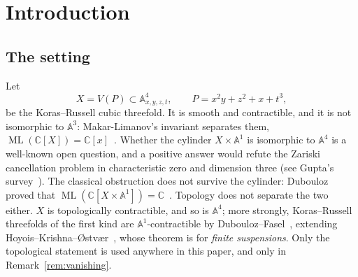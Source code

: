 \documentclass[11pt]{article}
\theoremstyle{definition}
\theoremstyle{remark}
\newcommand{\C}{\mathbb{C}}
\newcommand{\Aff}[1]{\mathbb{A}^{#1}}
\newcommand{\Gm}{\mathbb{G}_m}
\newcommand{\HBM}[1]{H^{\mathrm{BM}}_{#1}}
\newcommand{\ML}{\operatorname{ML}}
\begin{document}
\begin{abstract}
modification divisor, having the representative $F_{-1}$ contained in it, and
restricts to zero on the common open set. Its inverse image
$\sigma_4^{-1}(F_{-1})$ is $\Gm\times\Aff{1}$ --- the same plane with the fibre
over the defect point $(-1,0,0,0,0)$ deleted --- and the fundamental class of
that locus, pushed forward along its \emph{closed immersion} into the source,
lands in $\HBM{4}(X\times\Aff{1})=0$. We do not push classes forward along the
modification itself: it is not proper, as we prove. The defect thus accounts
exactly for the Euler and Grothendieck-class change and locates, at a single
named point, the cycle-level content of the change. This is a concrete
singular-defect instance of the established cofiber mechanism for affine
modifications. Nothing here bears on whether $X\times\Aff{1}\cong\Aff{4}$, and
no claim about that question is made.
\end{abstract}

\tableofcontents

\section{Introduction}\label{sec:intro}

\subsection{The setting}

Let
\begin{equation}\label{eq:X}
X = V(P)\subset\Aff{4}_{x,y,z,t},\qquad P = x^2y+z^2+x+t^3,
\end{equation}
be the Koras--Russell cubic threefold. It is smooth and contractible, and it
is not isomorphic to $\Aff{3}$: Makar-Limanov's invariant separates them,
$\ML(\C[X])=\C[x]$~\cite{MakarLimanov1996}. Whether the cylinder
$X\times\Aff{1}$ is isomorphic to $\Aff{4}$ is a well-known open question,
and a positive answer would refute the Zariski cancellation problem in
characteristic zero and dimension three (see Gupta's survey~\cite{Gupta2022}).
The classical obstruction does not survive the cylinder: Dubouloz proved that
$\ML(\C[X\times\Aff{1}])=\C$~\cite{Dubouloz2009}. Topology does not separate
the two either. $X$ is topologically contractible, and so is $\Aff{4}$; more
strongly, Koras--Russell threefolds of the first kind are
$\Aff{1}$-contractible by Dubouloz--Fasel~\cite{DF2015}, extending
Hoyois--Krishna--{\O}stv{\ae}r~\cite{HKO2014}, whose theorem is for
\emph{finite suspensions}. Only the topological statement is used anywhere in
this paper, and only in Remark~\ref{rem:vanishing}.
\end{document}
